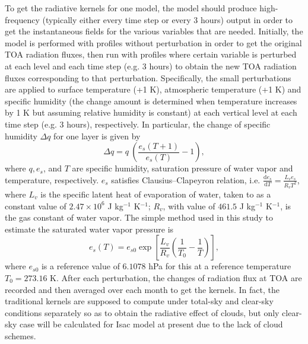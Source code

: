 To get the radiative kernels for one model, the model should produce high-frequency (typically either every time step or every 3 hours) output in order to get the instantaneous fields for the various variables that are needed. Initially, the model is performed with profiles without perturbation in order to get the original TOA radiation fluxes, then run with profiles where certain variable is perturbed at each level and each time step (e.g. 3 hours) to obtain the new TOA radiation fluxes corresponding to that perturbation. Specifically, the small perturbations are applied to surface temperature (+1 K), atmospheric temperature (+1 K) and specific humidity (the change amount is determined when temperature increases by 1 K but assuming relative humidity is constant) at each vertical level at each time step (e.g. 3 hours), respectively. In particular, the change of specific humidity $\Delta q$ for one layer is given by
\begin{equation}
\Delta q = q~\left(\frac{e_s(T+1)}{e_s(T)}-1\right),
\end{equation}
where $q, e_s$, and $T$ are specific humidity, saturation pressure of water vapor and temperature, respectively. $e_s$ satisfies Clausius–Clapeyron relation, i.e. $\frac {\mathrm{d} e_s} {\mathrm{d} T} = \frac{L_v e_s}{R_v T^2}$,
where $L_v$ is the specific latent heat of evaporation of water, taken to as a constant value of $2.47\times 10^6$ J kg$^{-1}$ K$^{-1}$; $R_v$, with value of $461.5$ J kg$^{-1}$ K$^{-1}$, is the gas constant of water vapor. The simple method used in this study to estimate the saturated water vapor pressure is 
\begin{equation}
e_s(T) = e_{s0}\exp\left[\frac{L_v}{R_v}\left(\frac{1}{T_0}-\frac{1}{T} \right)\right],
\end{equation}
where $e_{s0}$ is a reference value of $6.1078$ hPa for this at a reference temperature $T_0=273.16$ K. After each perturbation, the changes of radiation flux at TOA are recorded and then averaged over each month to get the kernels. In fact, the traditional kernels are supposed to compute under total-sky and clear-sky conditions separately so as to obtain the radiative effect of clouds, but only clear-sky case will be calculated for Isac model at present due to the lack of cloud schemes.

